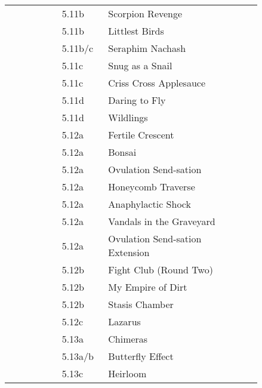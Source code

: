 \begin{flushleft}
\begin{center}
\begin{supertabular}{p{0.18\linewidth}p{0.13\linewidth}p{0.45\linewidth}p{0.08\linewidth}}
&5.11b&Scorpion Revenge & \pageref{rt:Scorpion Revenge} \\
&5.11b&Littlest Birds & \pageref{rt:Littlest Birds} \\
&5.11b/c&Seraphim Nachash & \pageref{rt:Seraphim Nachash} \\
&5.11c&Snug as a Snail & \pageref{rt:Snug as a Snail} \\
&5.11c&Criss Cross Applesauce & \pageref{rt:Criss Cross Applesauce} \\
&5.11d&Daring to Fly & \pageref{rt:Daring to Fly} \\
&5.11d&Wildlings & \pageref{rt:Wildlings} \\
&5.12a&Fertile Crescent & \pageref{rt:Fertile Crescent} \\
&5.12a&Bonsai & \pageref{rt:Bonsai} \\
&5.12a&Ovulation Send-sation & \pageref{rt:Ovulation Send-sation} \\
&5.12a&Honeycomb Traverse & \pageref{vr:Honeycomb Traverse} \\
&5.12a&Anaphylactic Shock & \pageref{rt:Anaphylactic Shock} \\
&5.12a&Vandals in the Graveyard & \pageref{rt:Vandals in the Graveyard} \\
&5.12a&Ovulation Send-sation Extension & \pageref{vr:Ovulation Send-sation Extension} \\
&5.12b&Fight Club (Round Two) & \pageref{rt:Fight Club (Round Two)} \\
&5.12b&My Empire of Dirt & \pageref{rt:My Empire of Dirt} \\
&5.12b&Stasis Chamber & \pageref{rt:Stasis Chamber} \\
&5.12c&Lazarus & \pageref{vr:Lazarus} \\
&5.13a&Chimeras & \pageref{rt:Chimeras} \\
&5.13a/b&Butterfly Effect & \pageref{rt:Butterfly Effect} \\
&5.13c&Heirloom & \pageref{rt:Heirloom} \\
\end{supertabular}
\end{center}

\end{flushleft}
